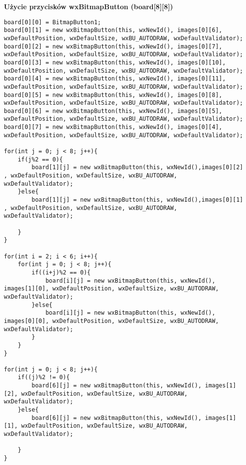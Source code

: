\documentclass[]{report}
\begin{document}
\begin{flushleft}
\textbf{Użycie przycisków wxBitmapButton (board[8][8])}
\end{flushleft}
\begin{lstlisting}
board[0][0] = BitmapButton1;
board[0][1] = new wxBitmapButton(this, wxNewId(), images[0][6], wxDefaultPosition, wxDefaultSize, wxBU_AUTODRAW, wxDefaultValidator);
board[0][2] = new wxBitmapButton(this, wxNewId(), images[0][7], wxDefaultPosition, wxDefaultSize, wxBU_AUTODRAW, wxDefaultValidator);
board[0][3] = new wxBitmapButton(this, wxNewId(), images[0][10], wxDefaultPosition, wxDefaultSize, wxBU_AUTODRAW, wxDefaultValidator);
board[0][4] = new wxBitmapButton(this, wxNewId(), images[0][11], wxDefaultPosition, wxDefaultSize, wxBU_AUTODRAW, wxDefaultValidator);
board[0][5] = new wxBitmapButton(this, wxNewId(), images[0][8], wxDefaultPosition, wxDefaultSize, wxBU_AUTODRAW, wxDefaultValidator);
board[0][6] = new wxBitmapButton(this, wxNewId(), images[0][5], wxDefaultPosition, wxDefaultSize, wxBU_AUTODRAW, wxDefaultValidator);
board[0][7] = new wxBitmapButton(this, wxNewId(), images[0][4], wxDefaultPosition, wxDefaultSize, wxBU_AUTODRAW, wxDefaultValidator);

for(int j = 0; j < 8; j++){
	if(j%2 == 0){
		board[1][j] = new wxBitmapButton(this, wxNewId(),images[0][2] , wxDefaultPosition, wxDefaultSize, wxBU_AUTODRAW, wxDefaultValidator);
	}else{
		board[1][j] = new wxBitmapButton(this, wxNewId(),images[0][1] , wxDefaultPosition, wxDefaultSize, wxBU_AUTODRAW, wxDefaultValidator);
		
	}
}

for(int i = 2; i < 6; i++){
	for(int j = 0; j < 8; j++){
		if((i+j)%2 == 0){
			board[i][j] = new wxBitmapButton(this, wxNewId(), images[1][0], wxDefaultPosition, wxDefaultSize, wxBU_AUTODRAW, wxDefaultValidator);
		}else{
			board[i][j] = new wxBitmapButton(this, wxNewId(), images[0][0], wxDefaultPosition, wxDefaultSize, wxBU_AUTODRAW, wxDefaultValidator);
		}
	}
}

for(int j = 0; j < 8; j++){
	if((j)%2 != 0){
		board[6][j] = new wxBitmapButton(this, wxNewId(), images[1][2], wxDefaultPosition, wxDefaultSize, wxBU_AUTODRAW, wxDefaultValidator);
	}else{
		board[6][j] = new wxBitmapButton(this, wxNewId(), images[1][1], wxDefaultPosition, wxDefaultSize, wxBU_AUTODRAW, wxDefaultValidator);
		
	}
}


\end{lstlisting}
\end{document}
